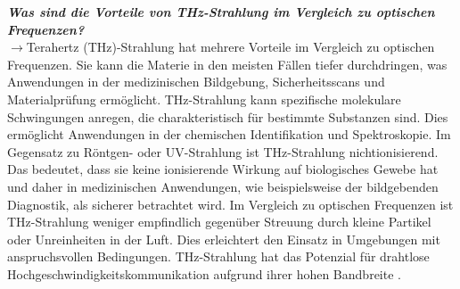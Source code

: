\textbf{\textit{Was sind die Vorteile von THz-Strahlung im Vergleich zu optischen Frequenzen?}}\\
$\rightarrow$Terahertz (THz)-Strahlung hat mehrere Vorteile im Vergleich zu optischen Frequenzen.
Sie kann die Materie in den meisten Fällen tiefer durchdringen, 
was Anwendungen in der medizinischen Bildgebung, Sicherheitsscans und Materialprüfung ermöglicht.
THz-Strahlung kann spezifische molekulare Schwingungen anregen, die charakteristisch 
für bestimmte Substanzen sind. 
Dies ermöglicht Anwendungen in der chemischen Identifikation und Spektroskopie.
Im Gegensatz zu Röntgen- oder UV-Strahlung ist THz-Strahlung nichtionisierend. 
Das bedeutet, dass sie keine ionisierende Wirkung auf biologisches Gewebe hat 
und daher in medizinischen Anwendungen, wie beispielsweise der bildgebenden Diagnostik, 
als sicherer betrachtet wird.
Im Vergleich zu optischen Frequenzen ist THz-Strahlung weniger empfindlich gegenüber 
Streuung durch kleine Partikel oder Unreinheiten in der Luft. 
Dies erleichtert den Einsatz in Umgebungen mit anspruchsvollen Bedingungen.
THz-Strahlung hat das Potenzial für drahtlose Hochgeschwindigkeitskommunikation 
aufgrund ihrer hohen Bandbreite \cite{Kohler,Gap,UltraFast}.